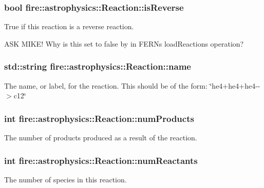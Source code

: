\subsubsection[{is\+Reverse}]{\setlength{\rightskip}{0pt plus 5cm}bool fire\+::astrophysics\+::\+Reaction\+::is\+Reverse}\label{a00033_ae161628da753400b3d2256e2d10a02b9}
True if this reaction is a reverse reaction.

A\+S\+K M\+I\+K\+E! Why is this set to false by in F\+E\+R\+N\textquotesingle{}s load\+Reactions operation? \hypertarget{a00033_abb359091e992ad4cb4cde0faacf6021b}{}
\subsubsection[{name}]{\setlength{\rightskip}{0pt plus 5cm}std\+::string fire\+::astrophysics\+::\+Reaction\+::name}\label{a00033_abb359091e992ad4cb4cde0faacf6021b}
The name, or label, for the reaction. This should be of the form\+: \char`\"{}he4+he4+he4-\/-\/$>$c12\char`\"{} \hypertarget{a00033_aa59b550e5dbdd34c9c563e7dfc2cbc1e}{}
\subsubsection[{num\+Products}]{\setlength{\rightskip}{0pt plus 5cm}int fire\+::astrophysics\+::\+Reaction\+::num\+Products}\label{a00033_aa59b550e5dbdd34c9c563e7dfc2cbc1e}
The number of products produced as a result of the reaction. \hypertarget{a00033_a86154569e16ef396c93cdf97c5eaf5b7}{}
\subsubsection[{num\+Reactants}]{\setlength{\rightskip}{0pt plus 5cm}int fire\+::astrophysics\+::\+Reaction\+::num\+Reactants}\label{a00033_a86154569e16ef396c93cdf97c5eaf5b7}
The number of species in this reaction. \hypertarget{a00033_a5033228e6305beb4e8dd717d2f088d99}{}
